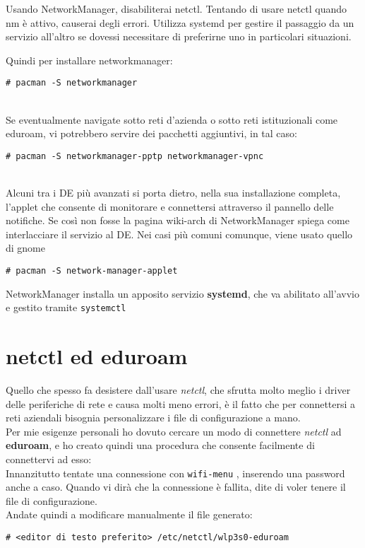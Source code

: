 \documentclass[twoside,italian]{book}
\newcommand{\nlinea}{
	\leavevmode
	\\
}
\newcommand{\centcode}[1]{
	
	\definecolor{centcode}{rgb}{0.5,0.1,0.1}
	
	\begin{center}
	 	\texttt{\textcolor{centcode}{#1}}
	\end{center}
	
	
}
\newcommand{\code}[1]{
	\texttt{\textcolor{code}{#1}}
}
\begin{document}
			\begin{tcolorbox}[floatplacement=b,width=\textwidth,colback={blue},title={NOTA BENE:},colbacktitle=gray,coltitle=white,colupper=white]
				Usando NetworkManager, disabiliterai netctl. Tentando di usare netctl quando nm è attivo, causerai degli errori. Utilizza systemd per gestire il passaggio da un servizio all'altro se dovessi necessitare di preferirne uno in particolari situazioni.
			\end{tcolorbox}
		
			Quindi per installare networkmanager: \centcode{\# pacman -S networkmanager}
			\nlinea
			Se eventualmente navigate sotto reti d'azienda o sotto reti istituzionali come eduroam, vi potrebbero servire dei pacchetti aggiuntivi, in tal caso:
			\centcode{\# pacman -S networkmanager-pptp networkmanager-vpnc}
			\nlinea
			
			Alcuni tra i DE più avanzati si porta dietro, nella sua installazione completa, l'applet che consente di monitorare e connettersi attraverso il pannello delle notifiche. Se così non fosse la pagina wiki-arch di NetworkManager spiega come interlacciare il servizio al DE.
			Nei casi più comuni comunque, viene usato quello di gnome \centcode{\# pacman -S network-manager-applet}
			
			NetworkManager installa un apposito servizio \textbf{systemd}, che va abilitato all'avvio e gestito tramite \code{systemctl}
			
		\section{netctl ed eduroam}
			Quello che spesso fa desistere dall'usare \textit{netctl}, che sfrutta molto meglio i driver delle periferiche di rete e causa molti meno errori, è il fatto che per connettersi a reti aziendali bisognia personalizzare i file di configurazione a mano. \\
			Per mie esigenze personali ho dovuto cercare un modo di connettere \textit{netctl} ad \textbf{eduroam}, e ho creato quindi una procedura che consente facilmente di connettervi ad esso:\\
			Innanzitutto tentate una connessione con \code{wifi-menu}, inserendo una password anche a caso. Quando vi dirà che la connessione è fallita, dite di voler tenere il file di configurazione.\\
			Andate quindi a modificare manualmente il file generato:\centcode{\# <editor di testo preferito> /etc/netctl/wlp3s0-eduroam}
			
\end{document}
